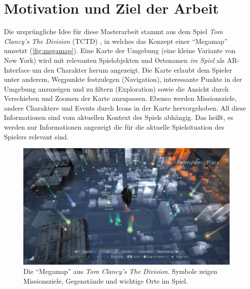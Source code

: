 \section{Motivation und Ziel der Arbeit}
\label{sec:motivation_ziel}
Die ursprüngliche Idee für diese Masterarbeit stammt aus dem Spiel \emph{Tom Clancy's The Division} (TCTD) \parencite{Ubisoft2018}, in welches das Konzept einer \enquote{Megamap} umsetzt (\autoref{fig:megamap}).
Eine Karte der Umgebung (eine kleine Variante von New York) wird mit relevanten Spielobjekten und Ortsnamen \emph{im Spiel} als AR-Interface um den Charakter herum angezeigt.
Die Karte erlaubt dem Spieler unter anderem, Wegpunkte festzulegen (Navigation), interessante Punkte in der Umgebung anzuzeigen und zu filtern (Exploration) sowie die Ansicht durch Verschieben und Zoomen der Karte anzupassen.
Ebenso werden Missionsziele, andere Charaktere und Events durch Icons in der Karte hervorgehoben.
All diese Informationen sind vom aktuellen Kontext des Spiels abhängig.
Das heißt, es werden nur Informationen angezeigt die für die aktuelle Spielsituation des Spielers relevant sind.
\begin{figure}[bth]
    \centering
    \includegraphics[width=\textwidth]{figures/the_division_megamap.jpg}
    \caption{Die \enquote{Megamap} aus \emph{Tom Clancy's The Division}. Symbole zeigen Missionsziele, Gegenstände und wichtige Orte im Spiel.}
    \label{fig:megamap}
\end{figure}

